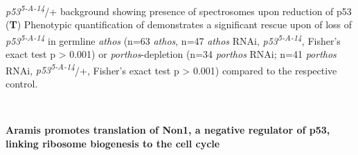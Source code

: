 \documentclass[12pt,oneside]{reedthesis}
\begin{document}
\emph{p53\textsuperscript{5-A-14}}/+ background showing presence of spectrosomes upon reduction of p53 (\textbf{T}) Phenotypic quantification of demonstrates a significant rescue upon of loss of \emph{p53\textsuperscript{5-A-14}} in germline \emph{athos} (n=63 \emph{athos}, n=47 \emph{athos} RNAi, \emph{p53\textsuperscript{5-A-14}}, Fisher's exact test p \textgreater{} 0.001) or \emph{porthos}-depletion (n=34 \emph{porthos} RNAi; n=41 \emph{porthos} RNAi, \emph{p53\textsuperscript{5-A-14}}/+, Fisher's exact test p \textgreater{} 0.001) compared to the respective control.


\textbf{\\
}

\textbf{Aramis promotes translation of Non1, a negative regulator of p53, linking ribosome biogenesis to the cell cycle}
\end{document}

